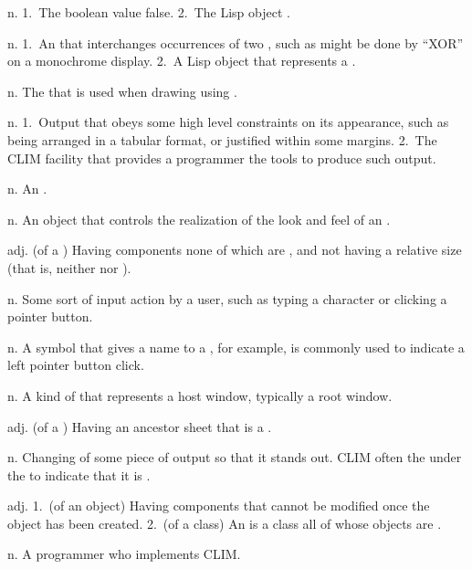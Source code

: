 \begin{description}
 {n.} {1.~The boolean value false.  2.~The Lisp object
.}

 {n.} {1.~An  that interchanges
occurrences of two , such as might be done by ``XOR'' on a
monochrome display.  2.~A Lisp object that represents a .}

 {n.} {The  that is used when drawing
using .}

 {n.} {1.~Output that obeys some high level
constraints on its appearance, such as being arranged in a tabular format, or
justified within some margins.  2.~The CLIM facility that provides a programmer
the tools to produce such output.}

 {n.} {An .}

 {n.} {An object that controls the realization of
the look and feel of an .}

 {adj.} {(of a ) Having
components none of which are , and not having a relative size (that is,
neither  nor ).}

 {n.} {Some sort of input action by a user, such as
typing a character or clicking a pointer button.}

 {n.} {A symbol that gives a name to a
, for example,  is commonly used to indicate a left
pointer button click.}

 {n.} {A kind of  that represents a
host window, typically a root window.}

 {adj.} {(of a ) Having an ancestor sheet
that is a .}

 {n.} {Changing of some piece of output so that it
stands out.  CLIM often  the  under the
 to indicate that it is .}

 {adj.} {1.~(of an object) Having components that
cannot be modified once the object has been created.  2.~(of a class) An
 is a class all of whose objects are .}

 {n.} {A programmer who implements CLIM.}


\end{description}
